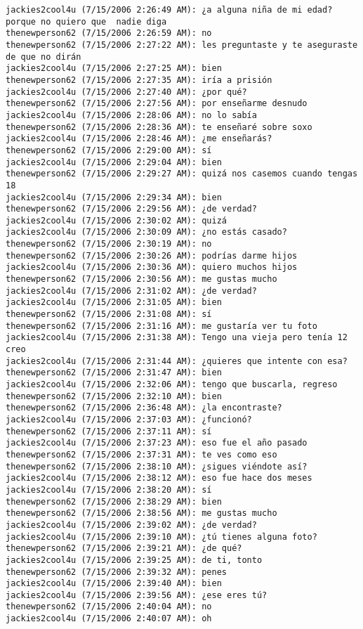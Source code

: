 \begin{verbatim}
jackies2cool4u (7/15/2006 2:26:49 AM): ¿a alguna niña de mi edad? porque no quiero que  nadie diga
thenewperson62 (7/15/2006 2:26:59 AM): no
thenewperson62 (7/15/2006 2:27:22 AM): les preguntaste y te aseguraste de que no dirán
jackies2cool4u (7/15/2006 2:27:25 AM): bien
thenewperson62 (7/15/2006 2:27:35 AM): iría a prisión
jackies2cool4u (7/15/2006 2:27:40 AM): ¿por qué?
thenewperson62 (7/15/2006 2:27:56 AM): por enseñarme desnudo
jackies2cool4u (7/15/2006 2:28:06 AM): no lo sabía
thenewperson62 (7/15/2006 2:28:36 AM): te enseñaré sobre soxo
jackies2cool4u (7/15/2006 2:28:46 AM): ¿me enseñarás?
thenewperson62 (7/15/2006 2:29:00 AM): sí
jackies2cool4u (7/15/2006 2:29:04 AM): bien
thenewperson62 (7/15/2006 2:29:27 AM): quizá nos casemos cuando tengas 18
jackies2cool4u (7/15/2006 2:29:34 AM): bien
thenewperson62 (7/15/2006 2:29:56 AM): ¿de verdad?
jackies2cool4u (7/15/2006 2:30:02 AM): quizá
jackies2cool4u (7/15/2006 2:30:09 AM): ¿no estás casado?
thenewperson62 (7/15/2006 2:30:19 AM): no
thenewperson62 (7/15/2006 2:30:26 AM): podrías darme hijos
jackies2cool4u (7/15/2006 2:30:36 AM): quiero muchos hijos
thenewperson62 (7/15/2006 2:30:56 AM): me gustas mucho
jackies2cool4u (7/15/2006 2:31:02 AM): ¿de verdad?
jackies2cool4u (7/15/2006 2:31:05 AM): bien
thenewperson62 (7/15/2006 2:31:08 AM): sí
thenewperson62 (7/15/2006 2:31:16 AM): me gustaría ver tu foto
jackies2cool4u (7/15/2006 2:31:38 AM): Tengo una vieja pero tenía 12 creo
jackies2cool4u (7/15/2006 2:31:44 AM): ¿quieres que intente con esa?
thenewperson62 (7/15/2006 2:31:47 AM): bien
jackies2cool4u (7/15/2006 2:32:06 AM): tengo que buscarla, regreso
thenewperson62 (7/15/2006 2:32:10 AM): bien
thenewperson62 (7/15/2006 2:36:48 AM): ¿la encontraste?
jackies2cool4u (7/15/2006 2:37:03 AM): ¿funcionó?
thenewperson62 (7/15/2006 2:37:11 AM): sí
jackies2cool4u (7/15/2006 2:37:23 AM): eso fue el año pasado
thenewperson62 (7/15/2006 2:37:31 AM): te ves como eso
thenewperson62 (7/15/2006 2:38:10 AM): ¿sigues viéndote así?
jackies2cool4u (7/15/2006 2:38:12 AM): eso fue hace dos meses
jackies2cool4u (7/15/2006 2:38:20 AM): sí
thenewperson62 (7/15/2006 2:38:29 AM): bien
thenewperson62 (7/15/2006 2:38:56 AM): me gustas mucho
jackies2cool4u (7/15/2006 2:39:02 AM): ¿de verdad?
jackies2cool4u (7/15/2006 2:39:10 AM): ¿tú tienes alguna foto?
thenewperson62 (7/15/2006 2:39:21 AM): ¿de qué?
jackies2cool4u (7/15/2006 2:39:25 AM): de ti, tonto
thenewperson62 (7/15/2006 2:39:32 AM): penes
jackies2cool4u (7/15/2006 2:39:40 AM): bien
jackies2cool4u (7/15/2006 2:39:56 AM): ¿ese eres tú?
thenewperson62 (7/15/2006 2:40:04 AM): no
jackies2cool4u (7/15/2006 2:40:07 AM): oh

\end{verbatim}
